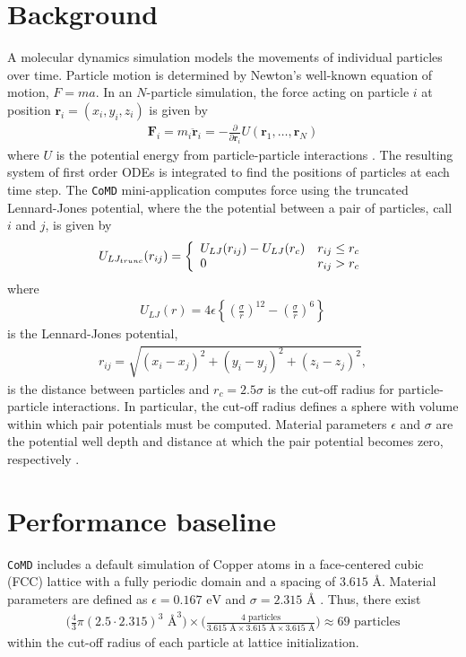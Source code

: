 \documentclass[12pt]{article}
\begin{document}
\section{Background}
A molecular dynamics simulation models the movements of individual particles over time. 
Particle motion is determined by Newton's well-known equation of motion, $F = ma$. 
In an $N$-particle simulation, the force acting on particle $i$ at position 
$\bm{r}_i = (x_i, y_i, z_i)$ is given by
\begin{align*}
    \textbf{F}_i = m_i \ddot{\bm{r}}_i = -\frac{\partial}{\partial \bm{r}_i} U(\bm{r}_1, \dots, \bm{r}_N)
\end{align*}
where $U$ is the potential energy from particle-particle interactions \cite{Intro}.
The resulting system of first order ODEs is integrated to find the positions of particles
at each time step. The \texttt{CoMD} mini-application computes force using the truncated 
Lennard-Jones potential, where the the potential between a pair of particles, call $i$ and $j$,
is given by
\begin{align}
U_{LJ_{trunc}}(r_{ij}) = 
\left\{ \begin{array}{l c} 
     U_{LJ}(r_{ij}) - U_{LJ}(r_c) & r_{ij} \le r_c \\
     0 & r_{ij} > r_c
    \end{array} \right.
\end{align}
where
\begin{align}
    U_{LJ}(r) = 
    4 \epsilon \left\{ \left(\frac{\sigma}{r}\right)^{12} - 
    \left(\frac{\sigma}{r}\right)^6 \right\}
\end{align}
is the Lennard-Jones potential,
\begin{align}
    r_{ij} = \sqrt{(x_i - x_j)^2 + (y_i - y_j)^2 + (z_i - z_j)^2}, 
\end{align}
is the distance between particles and $r_c = 2.5 \sigma$ is the cut-off radius for 
particle-particle interactions. In particular, the cut-off radius defines a sphere with
volume within which pair potentials must be computed. Material parameters 
$\epsilon$ and $\sigma$ are the potential well depth and distance at which the 
pair potential becomes zero, respectively \cite{Wiki}. 

\section{Performance baseline}
\texttt{CoMD} includes a default simulation of Copper atoms in a face-centered 
cubic (FCC) lattice with a fully periodic domain and a spacing of $3.615 \text{ \AA}$.
Material parameters are defined as $\epsilon = 0.167 \text{ eV}$ and $\sigma = 2.315 \text{ \AA}$ 
\cite{CoMD}. Thus, there exist
\begin{align}
     \bigg( \frac{4}{3} \pi (2.5 \cdot 2.315)^3 \text{ \AA}^3 \bigg) \times
     \bigg( \frac{4 \text{ particles}}{3.615 \text{ \AA} \times 3.615 \text{ \AA} \times 3.615 \text{ \AA}} \bigg)
     \approx 69 \text{ particles}
\end{align}
within the cut-off radius of each particle at lattice initialization. \\
\end{document}
